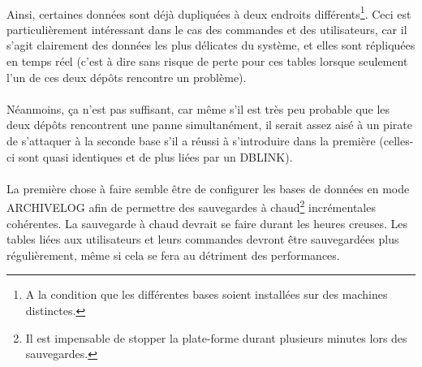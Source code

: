 \documentclass[a4paper,12pt,french]{article}
\begin{document}
    \paragraph{}
    Ainsi, certaines données sont déjà dupliquées à deux endroits
différents\footnote{A la condition que les différentes bases soient installées
sur des machines distinctes.}. Ceci est particulièrement intéressant dans le
cas des commandes et des utilisateurs, car il s'agit clairement des données les
plus délicates du système, et elles sont répliquées en temps réel (c'est à
dire sans risque de perte pour ces tables lorsque seulement l'un de ces deux
dépôts rencontre un problème).

    \paragraph{}
    Néanmoins, ça n'est pas suffisant, car même s'il est très peu probable que
les deux dépôts rencontrent une panne simultanément, il serait assez aisé à un
pirate de s'attaquer à la seconde base s'il a réussi à s'introduire dans la
première (celles-ci sont quasi identiques et de plus liées par un DBLINK).

    \paragraph{}
    La première chose à faire semble être de configurer les bases de données en
mode ARCHIVELOG afin de permettre des sauvegardes à chaud\footnote{Il est
impensable de stopper la plate-forme durant plusieurs minutes lors des
sauvegardes.} incrémentales cohérentes. La sauvegarde à chaud devrait se faire
durant les heures creuses. Les tables liées aux utilisateurs et leurs commandes
devront être sauvegardées plus régulièrement, même si cela se fera au détriment
des performances. 
\end{document}
